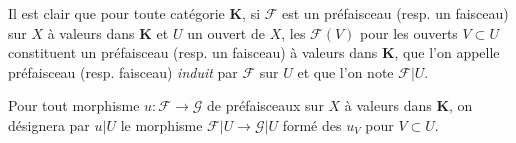 
\begin{env}[3.1.5]
\label{0.3.1.5-fr}
Il est clair que pour toute catégorie $\mathbf{K}$, si $\mathcal{F}$ est un
préfaisceau (resp. un faisceau) sur $X$ à valeurs dans $\mathbf{K}$ et $U$ un
ouvert de $X$, les $\mathcal{F}(V)$ pour les ouverts $V\subset U$ constituent
un préfaisceau (resp. un faisceau) à valeurs dans $\mathbf{K}$, que l'on
appelle préfaisceau (resp. faisceau) \emph{induit} par $\mathcal{F}$ sur $U$ et
que l'on note $\mathcal{F}|U$.

Pour tout morphisme $u:\mathcal{F}\to\mathcal{G}$ de préfaisceaux sur $X$ à
valeurs dans $\mathbf{K}$, on désignera par $u|U$ le morphisme
$\mathcal{F}|U\to\mathcal{G}|U$ formé des $u_V$ pour $V\subset U$.
\end{env}

